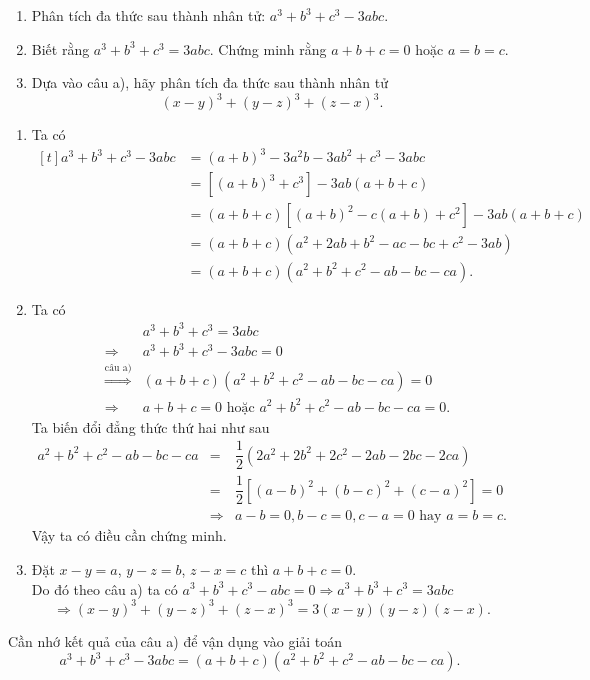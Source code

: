 \begin{vd}
	\begin{enumerate}
		\item Phân tích đa thức  sau thành nhân tử: $a^3 + b^3 + c^3 - 3abc$.
		\item Biết rằng $a^3 + b^3 + c^3 = 3abc$. Chứng minh rằng $a+b+c = 0$ hoặc $a=b=c$.
		\item Dựa vào câu a), hãy phân tích đa thức sau thành nhân tử
			\[(x-y)^3 + (y-z)^3 + (z-x)^3.\]
	\end{enumerate}
	\loigiai 
	{
		\begin{enumerate}
			\item Ta có 
			{\allowdisplaybreaks
				$\begin{aligned}[t]
					a^3 + b^3 + c^3 - 3abc &= (a+b)^3 - 3a^2b - 3ab^2 + c^3 - 3abc \\
						&= \left[(a+b)^3 + c^3\right] - 3ab(a+b+c) \\
						&= (a+b+c) \left[(a+b)^2 - c(a+b) + c^2\right] - 3ab(a+b+c) \\
						&= (a+b+c) \left(a^2 + 2ab + b^2 - ac - bc +c^2 - 3ab\right) \\
						&= (a+b+c) \left(a^2 + b^2 + c^2 - ab - bc - ca\right).
				\end{aligned}$
			}
			\item Ta có 
			{\allowdisplaybreaks
				\begin{eqnarray*}
					&& a^3 + b^3 + c^3 = 3abc \\
					&\Rightarrow& a^3 + b^3 + c^3 - 3abc = 0 \\
					&\stackrel{\text{câu a)}}{\Rightarrow}& (a+b+c)\left(a^2 + b^2 + c^2 - ab - bc - ca\right) = 0 \\
					&\Rightarrow& a + b + c = 0 \text{ hoặc } a^2 + b^2 + c^2 - ab - bc - ca = 0.
				\end{eqnarray*}
			}
				Ta biến đổi đẳng thức thứ hai như sau
			{\allowdisplaybreaks
				\begin{eqnarray*}
					a^2 + b^2 + c^2 - ab - bc - ca &=& \dfrac{1}{2} \left(2a^2 + 2b^2 + 2c^2 - 2ab - 2bc - 2ca\right) \\
					&=& \dfrac{1}{2} \left[(a-b)^2 + (b-c)^2 + (c-a)^2\right] = 0\\
					&\Rightarrow& a-b = 0, b-c = 0, c-a = 0 \text{ hay } a=b=c.
				\end{eqnarray*}
			}
				Vậy ta có điều cần chứng minh.
				
			\item Đặt $x - y = a$, $y - z = b$, $z - x = c$ thì $a+b+c = 0$. \\
				Do đó theo câu a) ta có $a^3 + b^3 + c^3 - abc = 0 \Rightarrow a^3 + b^3 + c^3 = 3abc$ \\
				\[\Rightarrow (x-y)^3 + (y-z)^3 + (z-x)^3 = 3(x-y)(y-z)(z-x).\]
		\end{enumerate}
		\begin{note}
			Cần nhớ kết quả của câu a) để vận dụng vào giải toán
			\[a^3 + b^3 + c^3 - 3abc = (a+b+c)\left(a^2 + b^2 + c^2 - ab - bc - ca\right).\]
		\end{note}		
	}
\end{vd}



